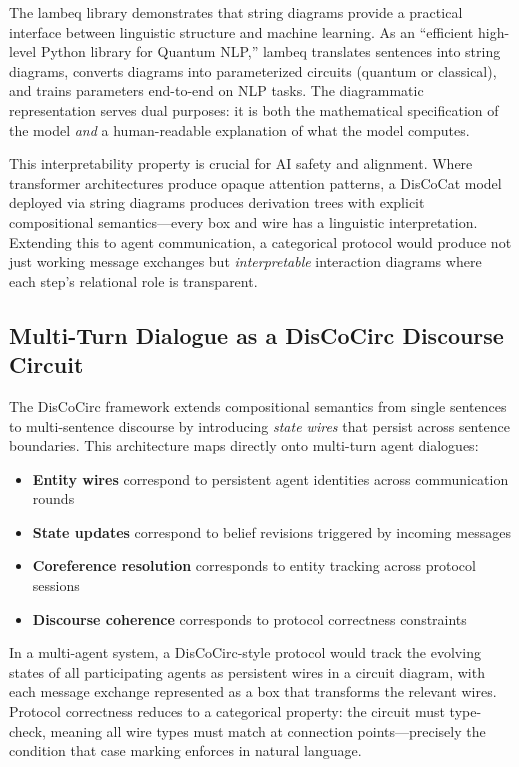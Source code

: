 \documentclass[
]{article}
\providecommand{\tightlist}{%
  \setlength{\itemsep}{0pt}\setlength{\parskip}{0pt}}
\begin{document}
The lambeq library \citep{lorenz2021lambeq} demonstrates that string
diagrams provide a practical interface between linguistic structure and
machine learning. As an ``efficient high-level Python library for
Quantum NLP,'' lambeq translates sentences into string diagrams,
converts diagrams into parameterized circuits (quantum or classical),
and trains parameters end-to-end on NLP tasks. The diagrammatic
representation serves dual purposes: it is both the mathematical
specification of the model \emph{and} a human-readable explanation of
what the model computes.

This interpretability property is crucial for AI safety and alignment.
Where transformer architectures produce opaque attention patterns, a
DisCoCat model deployed via string diagrams produces derivation trees
with explicit compositional semantics---every box and wire has a
linguistic interpretation. Extending this to agent communication, a
categorical protocol would produce not just working message exchanges
but \emph{interpretable} interaction diagrams where each step's
relational role is transparent.

\subsection{Multi-Turn Dialogue as a DisCoCirc Discourse
Circuit}\label{multi-turn-dialogue-as-a-discocirc-discourse-circuit}

The DisCoCirc framework \citep{defelice2022discocirc} extends
compositional semantics from single sentences to multi-sentence
discourse by introducing \emph{state wires} that persist across sentence
boundaries. This architecture maps directly onto multi-turn agent
dialogues:

\begin{itemize}
\tightlist
\item
  \textbf{Entity wires} correspond to persistent agent identities across
  communication rounds
\item
  \textbf{State updates} correspond to belief revisions triggered by
  incoming messages
\item
  \textbf{Coreference resolution} corresponds to entity tracking across
  protocol sessions
\item
  \textbf{Discourse coherence} corresponds to protocol correctness
  constraints
\end{itemize}

In a multi-agent system, a DisCoCirc-style protocol would track the
evolving states of all participating agents as persistent wires in a
circuit diagram, with each message exchange represented as a box that
transforms the relevant wires. Protocol correctness reduces to a
categorical property: the circuit must type-check, meaning all wire
types must match at connection points---precisely the condition that
case marking enforces in natural language.
\end{document}
